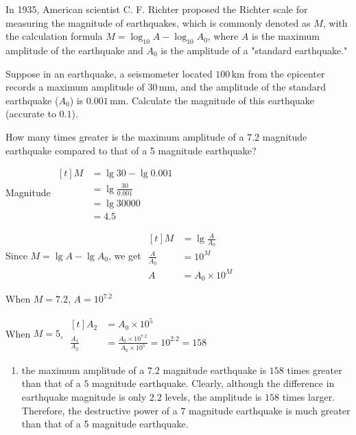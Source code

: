 \documentclass{report}
\begin{document}
			\begin{question}
				In 1935, American scientist C. F. Richter proposed the Richter scale for measuring the magnitude of earthquakes, which is commonly denoted as \( M \), with the calculation formula \( M = \log_{10} A - \log_{10} A_0 \), where \( A \) is the maximum amplitude of the earthquake and \( A_0 \) is the amplitude of a "standard earthquake."
				\begin{tasks}[label=(\alph*)]
					\task Suppose in an earthquake, a seismometer located \( 100 \, \text{km} \) from the epicenter records a maximum amplitude of \( 30 \, \text{mm} \), and the amplitude of the standard earthquake (\( A_0 \)) is \( 0.001 \, \text{mm} \). Calculate the magnitude of this earthquake (accurate to \( 0.1 \)).
					
					\task How many times greater is the maximum amplitude of a 7.2 magnitude earthquake compared to that of a 5 magnitude earthquake?
				\end{tasks}
				
				\sol{}
				\begin{tasks}[label=(\alph*)]
					\task Magnitude $\begin{aligned}[t]
					M & =\lg 30-\lg 0.001 \\
					& =\lg \frac{30}{0.001} \\
					& =\lg 30000 \\
					& =4.5
					\end{aligned}$
					
					\task Since $M = \lg A - \lg A_0$, we get $\begin{aligned}[t]
					M&=\lg \frac{A}{A_0} \\
					\frac{A}{A_0}&=10^M \\
					A&=A_0 \times 10^M
					\end{aligned}$
					
					When $M=7.2$, $A=10^{7.2}$
					
					When $M=5$, $\begin{aligned}[t]
					A_2 &= A_0 \times 10^5 \\
					\frac{A_1}{A_2} &= \frac{A_0 \times 10^7.2}{A_0 \times 10^{5}} = 10^{2.2} = 158
					\end{aligned}$
					\vspace{0.5em}
					\begin{enumerate}[label=$\therefore$, leftmargin=*]
						\item the maximum amplitude of a $7.2$ magnitude earthquake is $158$ times greater than that of a $5$ magnitude earthquake. Clearly, although the difference in earthquake magnitude is only $2.2$ levels, the amplitude is $158$ times larger. Therefore, the destructive power of a $7$ magnitude earthquake is much greater than that of a 5 magnitude earthquake.
					\end{enumerate}
				\end{tasks}
			\end{question}
			
\end{document}
